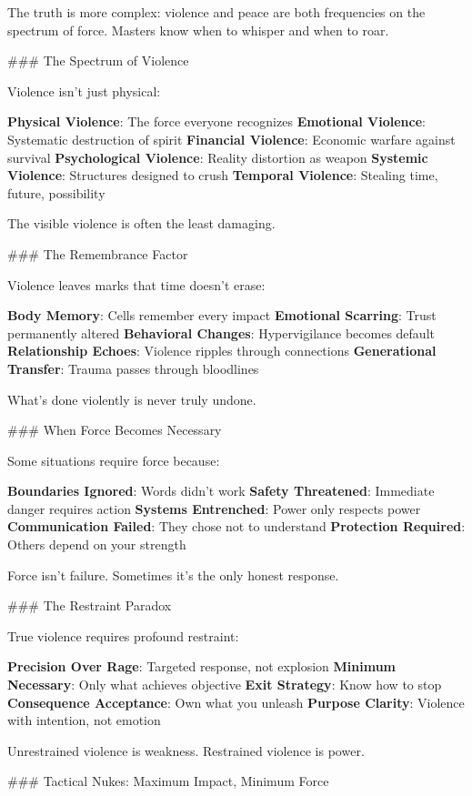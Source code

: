 \documentclass[12pt]{book}
\begin{document}
The truth is more complex: violence and peace are both frequencies on the spectrum of force. Masters know when to whisper and when to roar.

\#\#\# The Spectrum of Violence

Violence isn't just physical:

\textbf{Physical Violence}: The force everyone recognizes
\textbf{Emotional Violence}: Systematic destruction of spirit
\textbf{Financial Violence}: Economic warfare against survival
\textbf{Psychological Violence}: Reality distortion as weapon
\textbf{Systemic Violence}: Structures designed to crush
\textbf{Temporal Violence}: Stealing time, future, possibility

The visible violence is often the least damaging.

\#\#\# The Remembrance Factor

Violence leaves marks that time doesn't erase:

\textbf{Body Memory}: Cells remember every impact
\textbf{Emotional Scarring}: Trust permanently altered
\textbf{Behavioral Changes}: Hypervigilance becomes default
\textbf{Relationship Echoes}: Violence ripples through connections
\textbf{Generational Transfer}: Trauma passes through bloodlines

What's done violently is never truly undone.

\#\#\# When Force Becomes Necessary

Some situations require force because:

\textbf{Boundaries Ignored}: Words didn't work
\textbf{Safety Threatened}: Immediate danger requires action
\textbf{Systems Entrenched}: Power only respects power
\textbf{Communication Failed}: They chose not to understand
\textbf{Protection Required}: Others depend on your strength

Force isn't failure. Sometimes it's the only honest response.

\#\#\# The Restraint Paradox

True violence requires profound restraint:

\textbf{Precision Over Rage}: Targeted response, not explosion
\textbf{Minimum Necessary}: Only what achieves objective
\textbf{Exit Strategy}: Know how to stop
\textbf{Consequence Acceptance}: Own what you unleash
\textbf{Purpose Clarity}: Violence with intention, not emotion

Unrestrained violence is weakness. Restrained violence is power.

\#\#\# Tactical Nukes: Maximum Impact, Minimum Force
\end{document}
